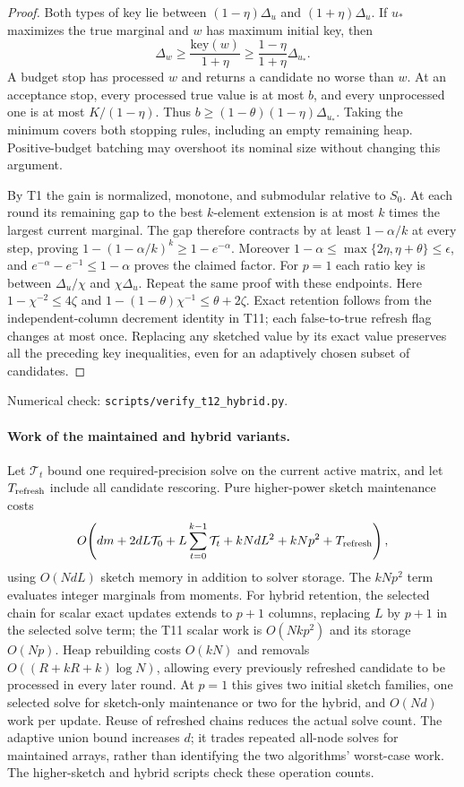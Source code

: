 \documentclass[11pt]{article}
\begin{document}
\begin{proof}
Both types of key lie between $(1-\eta)\Delta_u$ and
$(1+\eta)\Delta_u$. If $u_*$ maximizes the true marginal and
$w$ has maximum initial key, then
\[
 \Delta_w\geq\frac{\mathrm{key}(w)}{1+\eta}
 \geq\frac{1-\eta}{1+\eta}\Delta_{u_*}.
\]
A budget stop has processed $w$ and returns a candidate no worse
than $w$. At an acceptance stop, every processed true value is
at most $b$, and every unprocessed one is at most $K/(1-\eta)$.
Thus $b\geq(1-\theta)(1-\eta)\Delta_{u_*}$.
Taking the minimum covers both stopping rules, including an
empty remaining heap. Positive-budget batching may overshoot
its nominal size without changing this argument.

By T1 the gain is normalized, monotone, and submodular relative
to $S_0$. At each round its remaining gap to the best $k$-element
extension is at most $k$ times the largest current marginal.
The gap therefore contracts by at least $1-\alpha/k$ at every
step, proving $1-(1-\alpha/k)^k\geq1-e^{-\alpha}$.
Moreover $1-\alpha\leq\max\{2\eta,\eta+\theta\}\leq\epsilon$,
and $e^{-\alpha}-e^{-1}\leq1-\alpha$ proves the claimed factor.
For $p=1$ each ratio key is between $\Delta_u/\chi$ and
$\chi\Delta_u$. Repeat the same proof with these endpoints.
Here $1-\chi^{-2}\leq4\zeta$ and
$1-(1-\theta)\chi^{-1}\leq\theta+2\zeta$.
Exact retention follows from the independent-column decrement
identity in T11; each false-to-true refresh flag changes at most
once. Replacing any sketched value by its exact value preserves
all the preceding key inequalities, even for an adaptively
chosen subset of candidates.
\end{proof}
\noindent Numerical check:
\texttt{scripts/verify\_t12\_hybrid.py}.

\paragraph{Work of the maintained and hybrid variants.}
Let $\mathcal T_t$ bound one required-precision solve on the
current active matrix, and let $T_{\rm refresh}$ include all
candidate rescoring. Pure higher-power sketch maintenance costs
\[
 O\!\left(dm+2dL\mathcal T_0+
       L\sum_{t=0}^{k-1}\mathcal T_t+
       kNdL^2+kNp^2+T_{\rm refresh}\right),
\]
using $O(NdL)$ sketch memory in addition to solver storage.
The $kNp^2$ term evaluates integer marginals from moments.
For hybrid retention, the selected chain for scalar exact updates
extends to $p+1$ columns, replacing $L$ by $p+1$ in the selected
solve term; the T11 scalar work is $O(Nkp^2)$ and its storage
$O(Np)$. Heap rebuilding costs $O(kN)$ and removals
$O((R+kR+k)\log N)$, allowing every previously refreshed
candidate to be processed in every later round.
At $p=1$ this gives two initial sketch families, one selected
solve for sketch-only maintenance or two for the hybrid, and
$O(Nd)$ work per update. Reuse of refreshed chains reduces the
actual solve count. The adaptive union bound increases $d$;
it trades repeated all-node solves for maintained arrays, rather
than identifying the two algorithms' worst-case work.
The higher-sketch and hybrid scripts check these operation counts.
\end{document}
